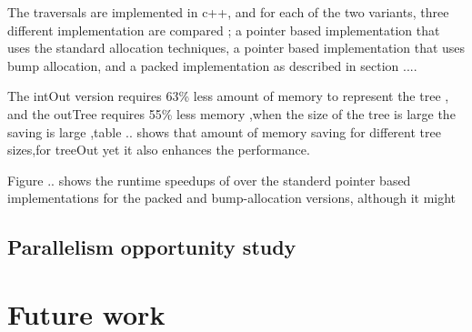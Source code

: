 \documentclass[preprint,10pt,nocopyrightspace,nonatbib]{./bibs/sigplanconf}
\begin{document}
The traversals are implemented in c++, and for each of the two variants, three different implementation are compared ; 
a pointer based implementation that uses the standard allocation techniques, a pointer based implementation that uses bump allocation, 
and a packed implementation as described in section .... 

The intOut version requires 63\% less amount of memory to represent the tree , and the outTree requires 55\% less memory ,when
the size of the tree is large the saving is large ,table .. shows that amount of memory saving for different tree sizes,for treeOut 
yet it also enhances the performance.

Figure .. shows the runtime speedups of over the standerd pointer based implementations for the packed and bump-allocation versions, 
although it might 

 
\subsection{Parallelism opportunity study}





\section{Future work}




\note{}


\end{document}
